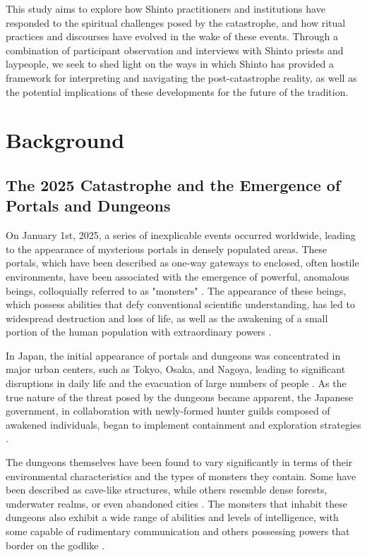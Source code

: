 \documentclass[12pt, a4paper]{article}
\begin{document}
This study aims to explore how Shinto practitioners and institutions have responded to the spiritual challenges posed by the catastrophe, and how ritual practices and discourses have evolved in the wake of these events. Through a combination of participant observation and interviews with Shinto priests and laypeople, we seek to shed light on the ways in which Shinto has provided a framework for interpreting and navigating the post-catastrophe reality, as well as the potential implications of these developments for the future of the tradition.

\section{Background}
\subsection{The 2025 Catastrophe and the Emergence of Portals and Dungeons}
On January 1st, 2025, a series of inexplicable events occurred worldwide, leading to the appearance of mysterious portals in densely populated areas. These portals, which have been described as one-way gateways to enclosed, often hostile environments, have been associated with the emergence of powerful, anomalous beings, colloquially referred to as "monsters" \citep{kim2027}. The appearance of these beings, which possess abilities that defy conventional scientific understanding, has led to widespread destruction and loss of life, as well as the awakening of a small portion of the human population with extraordinary powers \citep{lee2027}.

In Japan, the initial appearance of portals and dungeons was concentrated in major urban centers, such as Tokyo, Osaka, and Nagoya, leading to significant disruptions in daily life and the evacuation of large numbers of people \citep{nakano2026}. As the true nature of the threat posed by the dungeons became apparent, the Japanese government, in collaboration with newly-formed hunter guilds composed of awakened individuals, began to implement containment and exploration strategies \citep{sato2027}.

The dungeons themselves have been found to vary significantly in terms of their environmental characteristics and the types of monsters they contain. Some have been described as cave-like structures, while others resemble dense forests, underwater realms, or even abandoned cities \citep{yamamoto2026}. The monsters that inhabit these dungeons also exhibit a wide range of abilities and levels of intelligence, with some capable of rudimentary communication and others possessing powers that border on the godlike \citep{fujita2027}.
\end{document}
